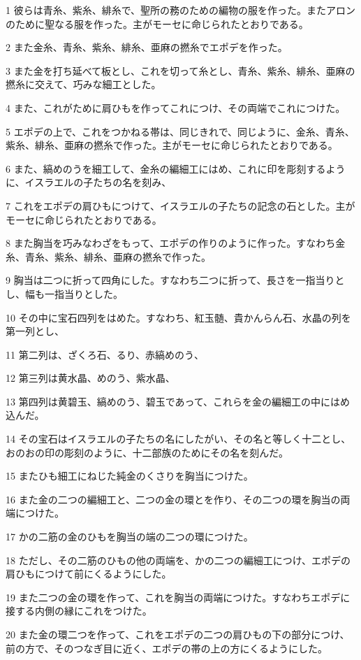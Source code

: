 \par 1 彼らは青糸、紫糸、緋糸で、聖所の務のための編物の服を作った。またアロンのために聖なる服を作った。主がモーセに命じられたとおりである。
\par 2 また金糸、青糸、紫糸、緋糸、亜麻の撚糸でエポデを作った。
\par 3 また金を打ち延べて板とし、これを切って糸とし、青糸、紫糸、緋糸、亜麻の撚糸に交えて、巧みな細工とした。
\par 4 また、これがために肩ひもを作ってこれにつけ、その両端でこれにつけた。
\par 5 エポデの上で、これをつかねる帯は、同じきれで、同じように、金糸、青糸、紫糸、緋糸、亜麻の撚糸で作った。主がモーセに命じられたとおりである。
\par 6 また、縞めのうを細工して、金糸の編細工にはめ、これに印を彫刻するように、イスラエルの子たちの名を刻み、
\par 7 これをエポデの肩ひもにつけて、イスラエルの子たちの記念の石とした。主がモーセに命じられたとおりである。
\par 8 また胸当を巧みなわざをもって、エポデの作りのように作った。すなわち金糸、青糸、紫糸、緋糸、亜麻の撚糸で作った。
\par 9 胸当は二つに折って四角にした。すなわち二つに折って、長さを一指当りとし、幅も一指当りとした。
\par 10 その中に宝石四列をはめた。すなわち、紅玉髄、貴かんらん石、水晶の列を第一列とし、
\par 11 第二列は、ざくろ石、るり、赤縞めのう、
\par 12 第三列は黄水晶、めのう、紫水晶、
\par 13 第四列は黄碧玉、縞めのう、碧玉であって、これらを金の編細工の中にはめ込んだ。
\par 14 その宝石はイスラエルの子たちの名にしたがい、その名と等しく十二とし、おのおの印の彫刻のように、十二部族のためにその名を刻んだ。
\par 15 またひも細工にねじた純金のくさりを胸当につけた。
\par 16 また金の二つの編細工と、二つの金の環とを作り、その二つの環を胸当の両端につけた。
\par 17 かの二筋の金のひもを胸当の端の二つの環につけた。
\par 18 ただし、その二筋のひもの他の両端を、かの二つの編細工につけ、エポデの肩ひもにつけて前にくるようにした。
\par 19 また二つの金の環を作って、これを胸当の両端につけた。すなわちエポデに接する内側の縁にこれをつけた。
\par 20 また金の環二つを作って、これをエポデの二つの肩ひもの下の部分につけ、前の方で、そのつなぎ目に近く、エポデの帯の上の方にくるようにした。

